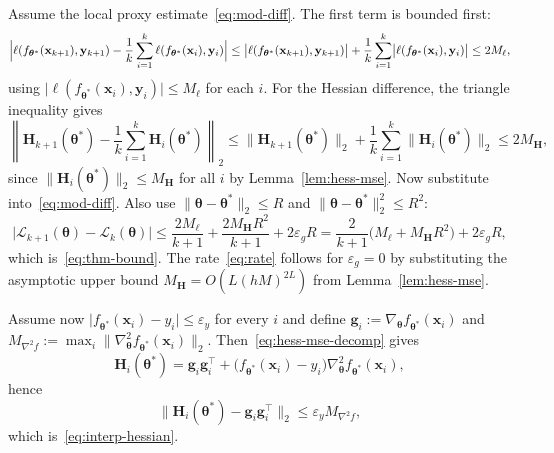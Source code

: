 \documentclass[10pt,letterpaper]{article}
\theoremstyle{definition}
\begin{document}
Assume the local proxy estimate~\eqref{eq:mod-diff}. The first term is bounded first:
\[
  \Bigl|\ell(f_{\boldsymbol{\theta}^*}(\mathbf{x}_{k+1}),\mathbf{y}_{k+1}) - \frac{1}{k}\sum_{i=1}^{k}\ell(f_{\boldsymbol{\theta}^*}(\mathbf{x}_{i}),\mathbf{y}_{i})\Bigr|
  \le \bigl|\ell(f_{\boldsymbol{\theta}^*}(\mathbf{x}_{k+1}),\mathbf{y}_{k+1})\bigr|
  + \frac{1}{k}\sum_{i=1}^{k}\bigl|\ell(f_{\boldsymbol{\theta}^*}(\mathbf{x}_{i}),\mathbf{y}_{i})\bigr|
  \le 2M_{\ell},
\]
using $\bigl|\ell(f_{\boldsymbol{\theta}^*}(\mathbf{x}_{i}),\mathbf{y}_i)\bigr|\le M_{\ell}$ for each $i$.
For the Hessian difference, the triangle inequality gives
\[
  \left\| \mathbf{H}_{k+1}(\boldsymbol{\theta}^*) - \frac{1}{k}\sum_{i=1}^{k}\mathbf{H}_i(\boldsymbol{\theta}^*) \right\|_2
  \le \|\mathbf{H}_{k+1}(\boldsymbol{\theta}^*)\|_2 + \frac{1}{k}\sum_{i=1}^{k}\|\mathbf{H}_i(\boldsymbol{\theta}^*)\|_2
  \le 2M_{\mathbf{H}},
\]
since $\|\mathbf{H}_i(\boldsymbol{\theta}^*)\|_2\le M_{\mathbf{H}}$ for all $i$ by Lemma~\ref{lem:hess-mse}.
Now substitute into~\eqref{eq:mod-diff}. Also use $\|\boldsymbol{\theta}-\boldsymbol{\theta}^*\|_2\le R$ and $\|\boldsymbol{\theta}-\boldsymbol{\theta}^*\|_2^2\le R^2$:
\[
  \bigl|\mathcal{L}_{k+1}(\boldsymbol{\theta}) - \mathcal{L}_k(\boldsymbol{\theta})\bigr|
  \le \frac{2M_{\ell}}{k+1} + \frac{2M_{\mathbf{H}}R^2}{k+1} + 2\varepsilon_g R
  = \frac{2}{k+1}\bigl(M_{\ell} + M_{\mathbf{H}}R^2\bigr) + 2\varepsilon_g R ,
\]
which is~\eqref{eq:thm-bound}. The rate~\eqref{eq:rate} follows for $\varepsilon_g=0$ by substituting the asymptotic upper bound
$M_{\mathbf{H}}=O(L(hM)^{2L})$ from Lemma~\ref{lem:hess-mse}.

Assume now $\bigl|f_{\boldsymbol{\theta}^*}(\mathbf{x}_i)-y_i\bigr|\le \varepsilon_y$ for every $i$ and define
$\mathbf{g}_i:=\nabla_{\boldsymbol{\theta}}f_{\boldsymbol{\theta}^*}(\mathbf{x}_i)$ and
$M_{\nabla^2 f}:=\max_i\|\nabla_{\boldsymbol{\theta}}^2f_{\boldsymbol{\theta}^*}(\mathbf{x}_i)\|_2$.
Then~\eqref{eq:hess-mse-decomp} gives
\[
  \mathbf{H}_i(\boldsymbol{\theta}^*)
  = \mathbf{g}_i\mathbf{g}_i^\top
  + \bigl(f_{\boldsymbol{\theta}^*}(\mathbf{x}_i)-y_i\bigr)\nabla_{\boldsymbol{\theta}}^2 f_{\boldsymbol{\theta}^*}(\mathbf{x}_i),
\]
hence
\[
  \bigl\|
    \mathbf{H}_i(\boldsymbol{\theta}^*)
    - \mathbf{g}_i\mathbf{g}_i^\top
  \bigr\|_2
  \le \varepsilon_y M_{\nabla^2 f},
\]
which is~\eqref{eq:interp-hessian}.
\end{document}
